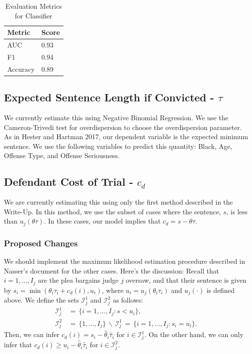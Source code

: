 \documentclass[11pt, oneside]{article}   	%
\theoremstyle{ModifiedStyle}
\begin{document}
	    \begin{table}[H]
	      \centering
	      \caption{Evaluation Metrics for Classifier}
	      \label{classifier-performance}
	      \begin{tabular}{|l|l|}
	      \hline
	      \textbf{Metric} & \textbf{Score} \\ \hline
	      AUC             & 0.93           \\ \hline
	      F1              & 0.94           \\ \hline
	      Accuracy        & 0.89           \\ \hline
	      \end{tabular}
	    \end{table}

		\subsection{Expected Sentence Length if Convicted - $\tau$}
	    \label{tau-estimation}
	    We currently estimate this using Negative Binomial Regression. We use the Cameron-Trivedi test for overdispersion to choose the overdispersion parameter. As in Hester and Hartman 2017, our dependent variable is the expected minimum sentence. We use the following variables to predict this quantity: Black, Age, Offense Type, and Offense Seriousness.

  \subsection{Defendant Cost of Trial - $c_d$}
    \label{c_d-estimation}
    We are currently estimating this using only the first method described in the Write-Up. In this method, we use the subset of cases where the sentence, $s$, is less than $u_j(\theta \tau)$. In these cases, our model implies that $c_d = s - \theta \tau$.

    \subsubsection{Proposed Changes}
      We should implement the maximum likelihood estimation procedure described in Nasser's document for the other cases. Here's the discussion:
      Recall that $i=1,\ldots,I_j$ are the plea bargains judge $j$ oversaw, and that their sentence is given by $s_i=\min(\theta_i\tau_i+c_d(i),u_i)$, where $u_i = u_j(\theta_i\tau_i)$ and $u_j(\cdot)$ is defined above. We define the sets $\mathcal{I}_j^1$ and $\mathcal{I}_j^2$ as follows:
  			\begin{align*}
  				\mathcal{I}_j^1 &\,=\, \{i=1,\ldots,I_j: s < u_i\}, \\
  				\mathcal{I}_j^2 &\,=\, \{1,\ldots,I_j\} \,\backslash\, \mathcal{I}_j^1 \,=\, \{i=1,\ldots,I_j:s_i=u_i\}.
  			\end{align*}
  			Then, we can infer $c_d(i) = s_i - \hat{\theta}_i\hat{\tau}_i$ for $i\in\mathcal{I}_j^1$. On the other hand, we can only infer that $c_d(i) \geq u_i - \hat{\theta}_i\hat{\tau}_i$ for $i\in\mathcal{I}^2_j$.
\end{document}
